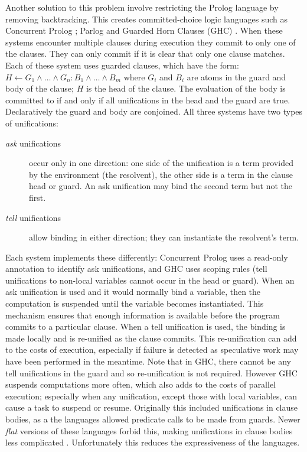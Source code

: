 Another solution to this problem involve restricting the Prolog language
by removing backtracking.
This creates committed-choice logic languages such as
Concurrent Prolog \citep*{saraswat86:concurrent_prolog_definition,
shapiro:flat_concur_prolog};
Parlog \citep*{clark:84:parlog_sys_prog,clark:86:parlog}
and Guarded Horn Clauses (GHC) \citep*{ueda:ghc}.
When these systems encounter multiple clauses during execution they commit
to only one of the clauses.
They can only commit if it is clear that only one clause matches.
Each of these system uses guarded clauses, which have the
form:
$H \leftarrow G_1 \wedge \ldots \wedge G_n : B_1 \wedge \ldots \wedge B_m$
where $G_i$ and $B_i$ are atoms in the guard and body of the
clause;
$H$ is the head of the clause.
The evaluation of the body is committed to if and only if 
all unifications in the head and the guard are true.
Declaratively the guard and body are conjoined.
All three systems have two types of unifications:
\begin{description}
    \item[\emph{ask} unifications] occur only in one direction:
    one side of the unification is a term provided by the
    environment (the resolvent),
    the other side is a term in the clause head or guard.
    An ask unification may bind the second term but not the first.

    \item[\emph{tell} unifications] allow binding in either direction;
    they can instantiate the resolvent's term.
\end{description}
Each system implements these differently:
Concurrent Prolog uses a read-only annotation to identify ask unifications,
and GHC uses scoping rules
(tell unifications to non-local variables cannot occur in the head or
guard).
When an ask unification is used and it would normally bind a variable,
then the computation is suspended until the variable becomes instantiated.
This mechanism ensures that enough information is available before the
program commits to a particular clause.
When a tell unification is used,
the binding is made locally and is re-unified as the clause commits.
This re-unification can add to the costs of execution,
especially if failure is detected as speculative work may have been
performed in the meantime.
Note that in GHC,
there cannot be any tell unifications in the guard and so re-unification is
not required.
However GHC suspends computations more often,
which also adds to the costs of parallel execution;
especially when any unification, except those with local variables,
can cause a task to suspend or resume.
Originally this included unifications in clause bodies,
as a the languages allowed predicate calls to be made from guards.
Newer \emph{flat} versions of these languages forbid this,
making unifications in clause bodies less complicated
\citep*{taylor:flat_concur_prolog,foster:1987:flat_parlog,modedghc}.
Unfortunately this reduces the expressiveness of the languages.

